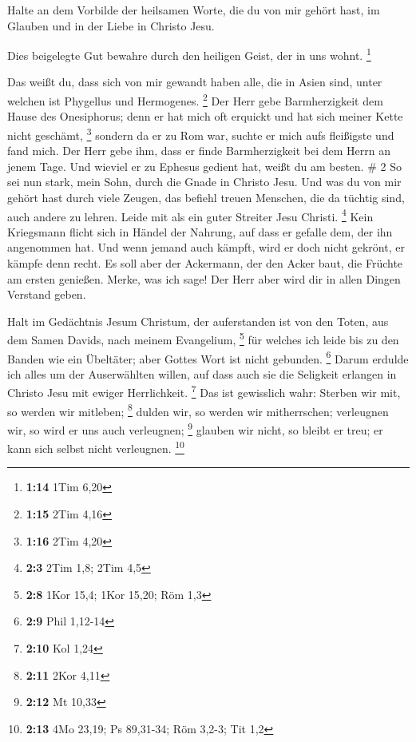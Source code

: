  Halte an dem Vorbilde der heilsamen Worte, die du von
mir gehört hast, im Glauben und in der Liebe in Christo Jesu.

 Dies beigelegte Gut bewahre durch den heiligen Geist,
der in uns wohnt. \footnote{\textbf{1:14} 1Tim 6,20}

 Das weißt du, dass sich von mir gewandt haben alle, die
in Asien sind, unter welchen ist Phygellus und Hermogenes. \footnote{\textbf{1:15}
  2Tim 4,16}  Der Herr gebe Barmherzigkeit dem Hause des
Onesiphorus; denn er hat mich oft erquickt und hat sich meiner Kette
nicht geschämt, \footnote{\textbf{1:16} 2Tim 4,20} 
sondern da er zu Rom war, suchte er mich aufs fleißigste und fand mich.
 Der Herr gebe ihm, dass er finde Barmherzigkeit bei dem
Herrn an jenem Tage. Und wieviel er zu Ephesus gedient hat, weißt du am
besten. \# 2  So sei nun stark, mein Sohn, durch die Gnade
in Christo Jesu.  Und was du von mir gehört hast durch
viele Zeugen, das befiehl treuen Menschen, die da tüchtig sind, auch
andere zu lehren.  Leide mit als ein guter Streiter Jesu
Christi. \footnote{\textbf{2:3} 2Tim 1,8; 2Tim 4,5}  Kein
Kriegsmann flicht sich in Händel der Nahrung, auf dass er gefalle dem,
der ihn angenommen hat.  Und wenn jemand auch kämpft, wird
er doch nicht gekrönt, er kämpfe denn recht.  Es soll aber
der Ackermann, der den Acker baut, die Früchte am ersten genießen.
Merke, was ich sage!  Der Herr aber wird dir in allen
Dingen Verstand geben.

 Halt im Gedächtnis Jesum Christum, der auferstanden ist
von den Toten, aus dem Samen Davids, nach meinem Evangelium, \footnote{\textbf{2:8}
  1Kor 15,4; 1Kor 15,20; Röm 1,3}  für welches ich leide
bis zu den Banden wie ein Übeltäter; aber Gottes Wort ist nicht
gebunden. \footnote{\textbf{2:9} Phil 1,12-14}  Darum
erdulde ich alles um der Auserwählten willen, auf dass auch sie die
Seligkeit erlangen in Christo Jesu mit ewiger Herrlichkeit. \footnote{\textbf{2:10}
  Kol 1,24}  Das ist gewisslich wahr: Sterben wir mit, so
werden wir mitleben; \footnote{\textbf{2:11} 2Kor 4,11} 
dulden wir, so werden wir mitherrschen; verleugnen wir, so wird er uns
auch verleugnen; \footnote{\textbf{2:12} Mt 10,33} 
glauben wir nicht, so bleibt er treu; er kann sich selbst nicht
verleugnen. \footnote{\textbf{2:13} 4Mo 23,19; Ps 89,31-34; Röm 3,2-3;
  Tit 1,2}

